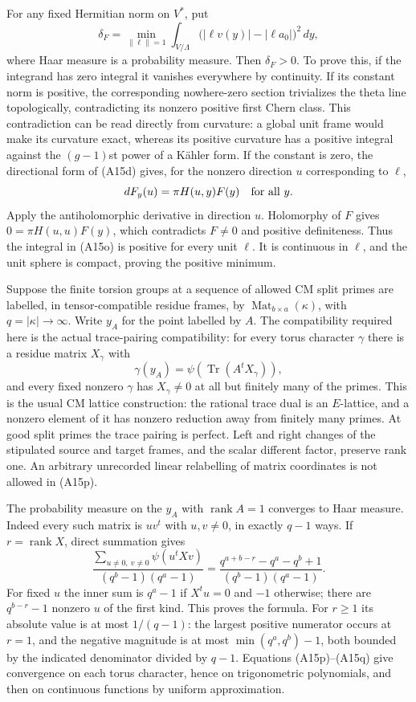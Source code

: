 \documentclass[11pt]{article}
\theoremstyle{definition}\newtheorem{definition}[theorem]{Definition}\newtheorem{remark}[theorem]{Remark}
\begin{document}
For any fixed Hermitian norm on $V^*$, put
\[
 \delta_F=\min_{\|\ell\|=1}
     \int_{V/\Lambda}
       \bigl(|\ell v(y)|-|\ell a_0|\bigr)^2\,dy,
 \tag{A15o}
\]
where Haar measure is a probability measure.  Then
$\delta_F>0$.  To prove this, if the integrand has zero integral
it vanishes everywhere by continuity.  If its constant norm is
positive, the corresponding nowhere-zero section trivializes the
theta line topologically, contradicting its nonzero positive
first Chern class.  This contradiction can be read directly from
curvature: a global unit frame would make its curvature exact,
whereas its positive curvature has a positive integral against
the $(g-1)$st power of a K\"ahler form.  If the constant is zero,
the directional form of (A15d) gives, for the nonzero direction
$u$ corresponding to $\ell$,
\[
             dF_y(u)=\pi H(u,y)F(y)\quad\hbox{for all }y.
\]
Apply the antiholomorphic derivative in direction $u$.  Holomorphy
of $F$ gives $0=\pi H(u,u)F(y)$, which contradicts $F\ne0$ and
positive definiteness.  Thus the integral in (A15o) is positive
for every unit $\ell$.  It is continuous in $\ell$, and the unit
sphere is compact, proving the positive minimum.

Suppose the finite torsion groups at a sequence of allowed CM split
primes are labelled, in tensor-compatible residue frames, by
$\operatorname{Mat}_{b\times a}(\kappa)$, with $q=|\kappa|\to\infty$.
Write $y_A$ for the point labelled by $A$.  The compatibility required
here is the actual trace-pairing compatibility: for every torus
character $\gamma$ there is a residue matrix $X_\gamma$ with
\[
        \gamma(y_A)=\psi(\operatorname{Tr}(A^tX_\gamma)),
 \tag{A15p}
\]
and every fixed nonzero $\gamma$ has $X_\gamma\ne0$ at all but
finitely many of the primes.  This is the usual CM lattice
construction: the rational trace dual is an $E$-lattice, and a
nonzero element of it has nonzero reduction away from finitely many
primes.  At good split primes the trace pairing is perfect.
Left and right changes of the stipulated source and target frames,
and the scalar different factor, preserve rank one.  An arbitrary
unrecorded linear relabelling of matrix coordinates is not allowed
in (A15p).

The probability measure on the $y_A$ with $\operatorname{rank}A=1$
converges to Haar measure.  Indeed every such matrix is $uv^t$ with
$u,v\ne0$, in exactly $q-1$ ways.  If $r=\operatorname{rank}X$, direct
summation gives
\[
 \frac{\sum_{u\ne0,\ v\ne0}\psi(u^tXv)}
            {(q^b-1)(q^a-1)}
  =\frac{q^{a+b-r}-q^a-q^b+1}{(q^b-1)(q^a-1)}.
 \tag{A15q}
\]
For fixed $u$ the inner sum is $q^a-1$ if $X^tu=0$ and $-1$
otherwise; there are $q^{b-r}-1$ nonzero $u$ of the first kind.
This proves the formula.  For $r\ge1$ its absolute value is at
most $1/(q-1)$: the largest positive numerator occurs at $r=1$,
and the negative magnitude is at most
$\min(q^a,q^b)-1$, both bounded by the indicated denominator
divided by $q-1$.  Equations (A15p)--(A15q) give convergence on
each torus character, hence on trigonometric polynomials, and then
on continuous functions by uniform approximation.
\end{document}
